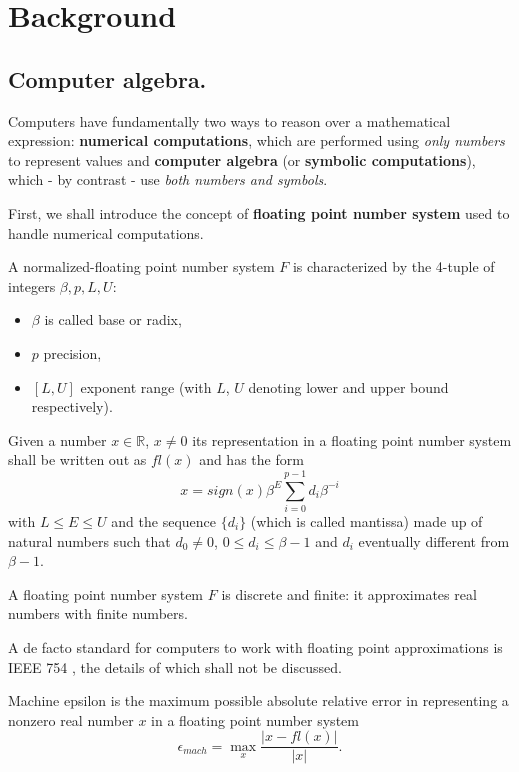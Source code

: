\section{Background}
\subsection*{Computer algebra.}
Computers have fundamentally two ways to reason over a mathematical expression: \textbf{numerical computations}, which are
performed using \textit{only numbers} to represent values and \textbf{computer algebra} (or \textbf{symbolic computations}),
which - by contrast - use \textit{both numbers and symbols}.

First, we shall introduce the concept of \textbf{floating point number system} used to handle numerical computations.
\begin{definition}
    A normalized-floating point number system \(F\) is characterized by the 4-tuple of integers \(\beta, p, L, U\):
    \begin{itemize}[topsep=0pt, itemsep=0pt, parsep=0pt]
        \item \(\beta\) is called base or radix,
        \item \(p\) precision,
        \item \([L, U]\) exponent range (with \(L\), \(U\) denoting lower and upper bound respectively).
    \end{itemize}
    Given a number \(x \in \mathbb{R}\), \(x \neq 0\) its representation in a floating point number system shall be written out as
    \(fl(x)\) and has the form
    \[x = sign(x) \beta^E \sum_{i=0}^{p-1}d_{i}\beta^{-i}\]
    with \(L \leq E \leq U\) and the sequence \(\{d_{i}\}\) (which is called mantissa) made up of natural numbers such that
    \(d_{0} \neq 0\), \(0 \leq d_{i} \leq \beta - 1\) and \(d_{i}\) eventually different from \(\beta - 1\).
\end{definition}
\begin{remark}
    A floating point number system \(F\) is discrete and finite: it approximates real numbers with finite numbers.
\end{remark}

A de facto standard for computers to work with floating point approximations is IEEE 754 \cite{ieeefp}, the details of which
shall not be discussed.

\begin{definition}
    Machine epsilon is the maximum possible absolute relative error in representing a nonzero real number \(x\) in a floating point
    number system
    \[\epsilon_{mach} = \max \limits_{x} \dfrac{\vert x - fl(x) \vert}{\vert x \vert}.\]
\end{definition}

